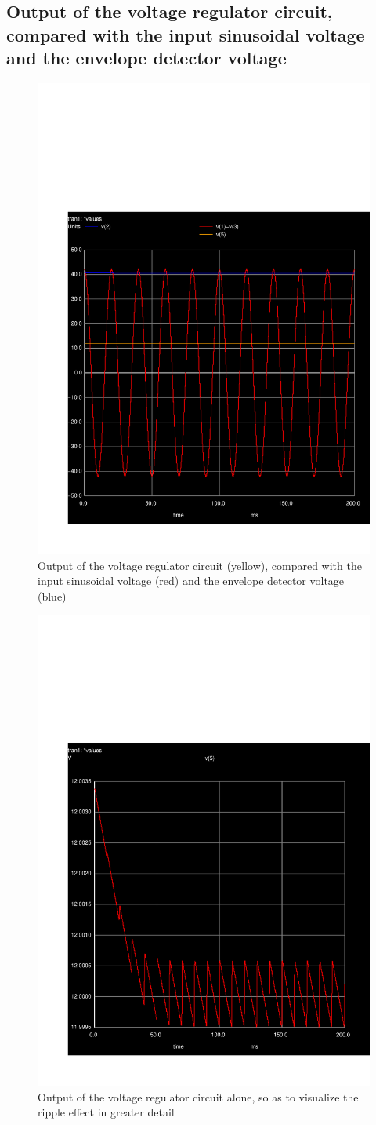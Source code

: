 \subsection{Output of the voltage regulator circuit, compared with the input sinusoidal voltage and the envelope detector voltage}

\par
\begin{figure}[H] \centering
\includegraphics[width=0.6\linewidth]{vs_vout_venv.pdf}
\caption{Output of the voltage regulator circuit (yellow), compared with the input sinusoidal voltage (red) and the envelope detector voltage (blue)}
\label{fig:vs_venv_vout}
\end{figure}

\par
\begin{figure}[H] \centering
\includegraphics[width=0.6\linewidth]{vout.pdf}
\caption{Output of the voltage regulator circuit alone, so as to visualize the ripple effect in greater detail}
\label{fig:vout}
\end{figure}

